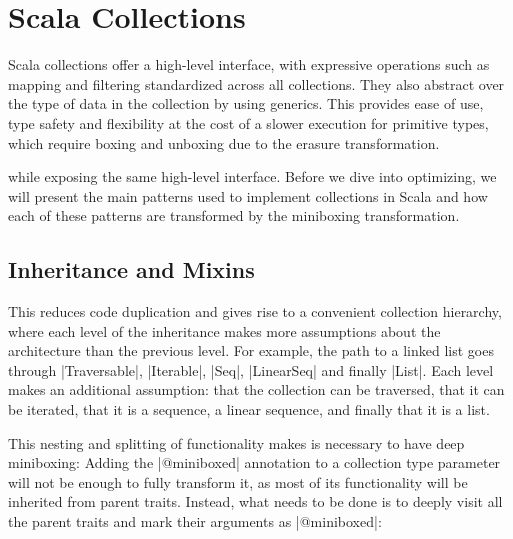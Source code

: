 \section{Scala Collections}


Scala collections offer a high-level interface, with expressive operations such as mapping and filtering standardized across all collections. They also abstract over the type of data in the collection by using generics. This provides ease of use, type safety and flexibility at the cost of a slower execution for primitive types, which require boxing and unboxing due to the erasure transformation.

 while exposing the same high-level interface.
Before we dive into optimizing, we will present the main patterns used to implement collections in Scala and how each of these patterns are transformed by the miniboxing transformation. %

\subsection{Inheritance and Mixins}

 This reduces code duplication and gives rise to a convenient collection hierarchy, where each level of the inheritance makes more assumptions about the architecture than the previous level. For example, the path to a linked list goes through |Traversable|, |Iterable|, |Seq|, |LinearSeq| and finally |List|. Each level makes an additional assumption: that the collection can be traversed, that it can be iterated, that it is a sequence, a linear sequence, and finally that it is a list.

This nesting and splitting of functionality makes is necessary to have deep miniboxing: Adding the |@miniboxed| annotation to a collection type parameter will not be enough to fully transform it, as most of its functionality will be inherited from parent traits. Instead, what needs to be done is to deeply visit all the parent traits and mark their arguments as |@miniboxed|:

